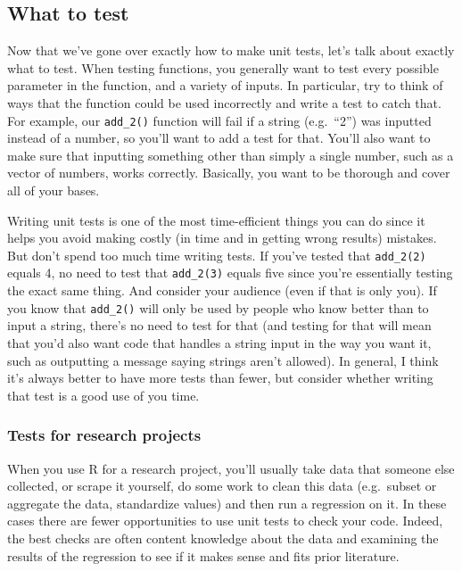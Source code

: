 \documentclass[
  12pt,
  openany]{book}
\begin{document}
\hypertarget{what-to-test}{%
\subsection{What to test}\label{what-to-test}}

Now that we've gone over exactly how to make unit tests, let's talk about exactly what to test. When testing functions, you generally want to test every possible parameter in the function, and a variety of inputs. In particular, try to think of ways that the function could be used incorrectly and write a test to catch that. For example, our \texttt{add\_2()} function will fail if a string (e.g.~``2'') was inputted instead of a number, so you'll want to add a test for that. You'll also want to make sure that inputting something other than simply a single number, such as a vector of numbers, works correctly. Basically, you want to be thorough and cover all of your bases.

Writing unit tests is one of the most time-efficient things you can do since it helps you avoid making costly (in time and in getting wrong results) mistakes. But don't spend too much time writing tests. If you've tested that \texttt{add\_2(2)} equals 4, no need to test that \texttt{add\_2(3)} equals five since you're essentially testing the exact same thing. And consider your audience (even if that is only you). If you know that \texttt{add\_2()} will only be used by people who know better than to input a string, there's no need to test for that (and testing for that will mean that you'd also want code that handles a string input in the way you want it, such as outputting a message saying strings aren't allowed). In general, I think it's always better to have more tests than fewer, but consider whether writing that test is a good use of you time.

\hypertarget{tests-for-research-projects}{%
\subsubsection{Tests for research projects}\label{tests-for-research-projects}}

When you use R for a research project, you'll usually take data that someone else collected, or scrape it yourself, do some work to clean this data (e.g.~subset or aggregate the data, standardize values) and then run a regression on it. In these cases there are fewer opportunities to use unit tests to check your code. Indeed, the best checks are often content knowledge about the data and examining the results of the regression to see if it makes sense and fits prior literature.
\end{document}
